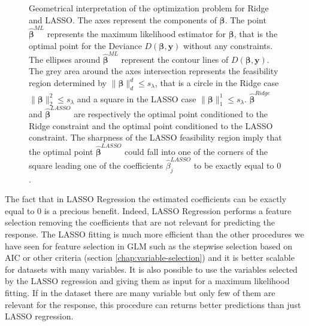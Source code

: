 \documentclass[a4paper, nobind]{templates/ociamthesis}
\theoremstyle{definition}
\theoremstyle{definition}
\theoremstyle{definition}
\theoremstyle{remark}
\begin{document}
\begin{figure}[!hbtp]

{\centering {}

}

\caption[Geometrical interpretation of the optimization problem for Ridge and LASSO.]{Geometrical interpretation of the optimization problem for Ridge and LASSO. The axes represent the components of \(\boldsymbol{\beta}\). The point \(\hat{\boldsymbol{\beta}}^{ML}\) represents the maximum likelihood estimator for \(\boldsymbol{\beta}\), that is the optimal point for the Deviance \(D(\boldsymbol{\beta}, \boldsymbol{y})\) without any constraints. The ellipses around \(\hat{\boldsymbol{\beta}}^{ML}\) represent the contour lines of \(D(\boldsymbol{\beta}, \boldsymbol{y})\). The grey area around the axes intersection represents the feasibility region determined by \(\|\boldsymbol{\beta}\|_d^d \le s_\lambda\), that is a circle in the Ridge case \(\|\boldsymbol{\beta}\|_2^2 \le s_\lambda\) and a square in the LASSO case \(\|\boldsymbol{\beta}\|_1^1 \le s_\lambda\). \(\hat{\boldsymbol{\beta}}^{Ridge}\) and \(\hat{\boldsymbol{\beta}}^{LASSO}\) are respectively the optimal point conditioned to the Ridge constraint and the optimal point conditioned to the LASSO constraint. The sharpness of the LASSO feasibility region imply that the optimal point \(\hat{\boldsymbol{\beta}}^{LASSO}\) could fall into one of the corners of the square leading one of the coefficients \(\hat{\beta}_j^{LASSO}\) to be exactly equal to \(0\).}\label{fig:opt-ridge-lasso}
\end{figure}

The fact that in LASSO Regression the estimated coefficients can be exactly equal to \(0\) is a precious benefit. Indeed, LASSO Regression performs a feature selection removing the coefficients that are not relevant for predicting the response. The LASSO fitting is much more efficient than the other procedures we have seen for feature selection in GLM such as the stepwise selection based on AIC or other criteria (section \ref{chap:variable-selection}) and it is better scalable for datasets with many variables. It is also possible to use the variables selected by the LASSO regression and giving them as input for a maximum likelihood fitting. If in the dataset there are many variable but only few of them are relevant for the response, this procedure can returns better predictions than just LASSO regression.
\end{document}
